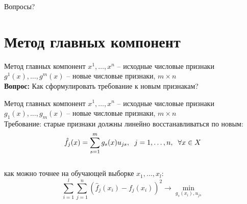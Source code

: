 \documentclass[10pt]{beamer}
\begin{document}
\begin{frame}[standout]
  Вопросы?
\end{frame}

\appendix

\section{Метод главных компонент}

\begin{frame}{Метод главных компонент}
	$x^1, \dots, x^n$ -- исходные числовые признаки\\
	$g^1(x), \dots, g^m(x)$ -- новые числовые признаки, $m \times n$\\
	\bigbreak
	\textbf{Вопрос:} Как сформулировать требование к новым признакам?
\end{frame}

\begin{frame}{Метод главных компонент}
	$x^1, \dots, x^n$ -- исходные числовые признаки\\
	$g_1(x), \dots, g_m(x)$ -- новые числовые признаки, $m \times n$\\
	\bigbreak
	\pause
	Требование: старые признаки должны линейно восстанавливаться по новым:\\
	$$\hat{f}_j(x) = \sum\limits_{s=1}^m g_s(x) u_{js} , \hspace{2mm} j = 1,\dots , n, \hspace{2mm} \forall x \in X$$\\
	как можно точнее на обучающей выборке $x_1, \dots, x_l$:\\
	$$\sum\limits_{i=1}^l \sum\limits_{j=1}^n (\hat{f}_j(x_i) - f_j(x_i))^2 \rightarrow \min\limits_{g_s(x_i), u_{js}}$$
\end{frame}
\end{document}
